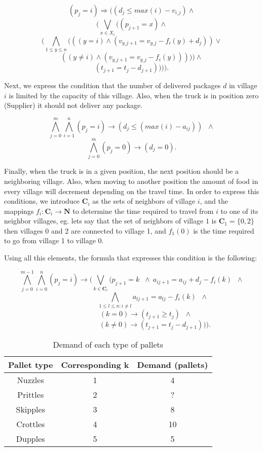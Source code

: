 \documentclass[a4paper]{article}
\begin{document}
\[ (p_j = i) \Rightarrow ( (d_j \leq max(i) - v_{i\_j}) \wedge \]
\[ (\bigvee_{x \in X_i} ((p_{j+1} = x) \wedge \]
\[ (\bigwedge_{1 \leq y \leq n} (((y=i) \wedge (v_{y\_j+1} = v_{y\_j} - f_i(y) + d_j)) \vee \]
\[ ((y \neq i) \wedge (v_{y\_j+1} = v_{y\_j} - f_i(y))))) \wedge \]
\[ (t_{j+1} = t_j - d_{j+1})))).\]


Next, we express the condition that the number of delivered packages $d$ in village $i$ is limited by the capacity of this village. Also, when the truck is in position zero (Supplier) it should not deliver any package.

\[\bigwedge_{j=0}^m \bigwedge_{i=1}^n (p_j = i) \rightarrow (d_j \leq (max(i) - a_{ij})) \;\;\wedge\]
\[\bigwedge_{j=0}^m (p_j = 0) \rightarrow (d_j = 0) .\]

Finally, when the truck is in a given position, the next position should be a neighboring village. Also, when moving to another position the amount of food in every village will decrement depending on the travel time. In order to express this conditions, we introduce $\textbf{C}_i$ as the sets of neighbors of village $i$, and the mappings $f_i:\textbf{C}_i \rightarrow \textbf{N}$ to determine the time required to travel from $i$ to one of its neighbor villages, eg. lets say that the set of neighbors of village $1$ is $\textbf{C}_1 = \{0,2\}$ then villages 0 and 2 are connected to village 1, and $f_1(0)$ is the time required to go from village 1 to village 0.

Using all this elements, the formula that expresses this condition is the following:

\[\bigwedge_{j=0}^{m-1} \bigwedge_{i=0}^n (p_j = i) \rightarrow (\bigvee_{k \in \textbf{C}_i} (p_{j+1}=k \;\;\wedge\ a_{ij+1} = a_{ij} + d_{j} - f_i(k) \;\;\wedge\]
\[\qquad \qquad \qquad \bigwedge_{1\leq l \leq n:i\neq l} a_{lj+1} = a_{lj} - f_i(k) \;\;\wedge\]
\[\qquad \qquad(k=0) \rightarrow (t_{j+1} \geq t_j) \;\;\wedge\]
\[\qquad \qquad \qquad \; \;(k\neq0) \rightarrow (t_{j+1} = t_j - d_{j+1}) )).\]


\begin{table}[H]
\centering
\caption{Demand of each type of pallets}
\label{my-label}
\begin{tabular}{c|c|c}
\textbf{Pallet type} & \textbf{Corresponding k} & \textbf{Demand (pallets)} \\ \hline
Nuzzles              & 1                        & 4                  		\\ \hline
Prittles             & 2                        & ?                  		\\ \hline
Skipples             & 3                        & 8                 		\\ \hline
Crottles             & 4                        & 10                 		\\ \hline
Dupples              & 5                        & 5                 
\end{tabular}
\end{table}
\end{document}
